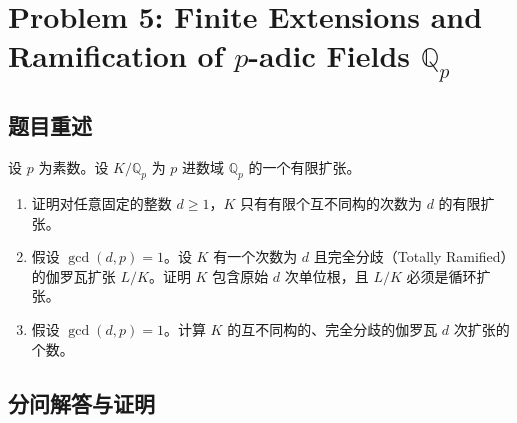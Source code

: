 \documentclass[]{article}
\begin{document}
	\section*{Problem 5: Finite Extensions and Ramification of $p$-adic Fields $\mathbb{Q}_p$}
	
	\subsection*{题目重述}
	设 $p$ 为素数。设 $K/\mathbb{Q}_p$ 为 $p$ 进数域 $\mathbb{Q}_p$ 的一个有限扩张。
	\begin{enumerate}[label=(\arabic*)]
		\item 证明对任意固定的整数 $d \ge 1$，$K$ 只有有限个互不同构的次数为 $d$ 的有限扩张。
		\item 假设 $\gcd(d,p)=1$。设 $K$ 有一个次数为 $d$ 且完全分歧（Totally Ramified）的伽罗瓦扩张 $L/K$。证明 $K$ 包含原始 $d$ 次单位根，且 $L/K$ 必须是循环扩张。
		\item 假设 $\gcd(d,p)=1$。计算 $K$ 的互不同构的、完全分歧的伽罗瓦 $d$ 次扩张的个数。
	\end{enumerate}
	
	\subsection*{分问解答与证明}
	
\end{document}
